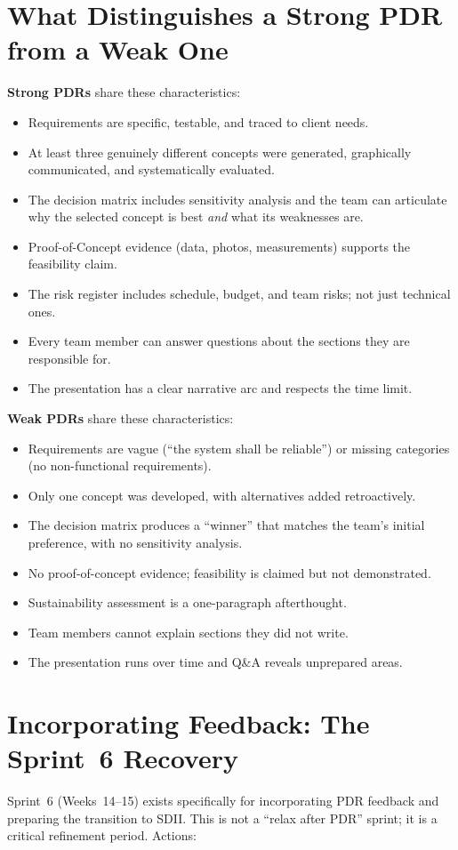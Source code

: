 \section{What Distinguishes a Strong PDR from a Weak One}
\textbf{Strong PDRs} share these characteristics:
\begin{itemize}[nosep,leftmargin=1.5em]
\item Requirements are specific, testable, and traced to client needs.
\item At least three genuinely different concepts were generated, graphically communicated, and systematically evaluated.
\item The decision matrix includes sensitivity analysis and the team can articulate why the selected concept is best \emph{and} what its weaknesses are.
\item Proof-of-Concept evidence (data, photos, measurements) supports the feasibility claim.
\item The risk register includes schedule, budget, and team risks; not just technical ones.
\item Every team member can answer questions about the sections they are responsible for.
\item The presentation has a clear narrative arc and respects the time limit.
\end{itemize}

\textbf{Weak PDRs} share these characteristics:
\begin{itemize}[nosep,leftmargin=1.5em]
\item Requirements are vague (``the system shall be reliable'') or missing categories (no non-functional requirements).
\item Only one concept was developed, with alternatives added retroactively.
\item The decision matrix produces a ``winner'' that matches the team's initial preference, with no sensitivity analysis.
\item No proof-of-concept evidence; feasibility is claimed but not demonstrated.
\item Sustainability assessment is a one-paragraph afterthought.
\item Team members cannot explain sections they did not write.
\item The presentation runs over time and Q\&A reveals unprepared areas.
\end{itemize}

\section{Incorporating Feedback: The Sprint~6 Recovery}
Sprint~6 (Weeks~14--15) exists specifically for incorporating PDR feedback and preparing the transition to SDII. This is not a ``relax after PDR'' sprint; it is a critical refinement period. Actions:

